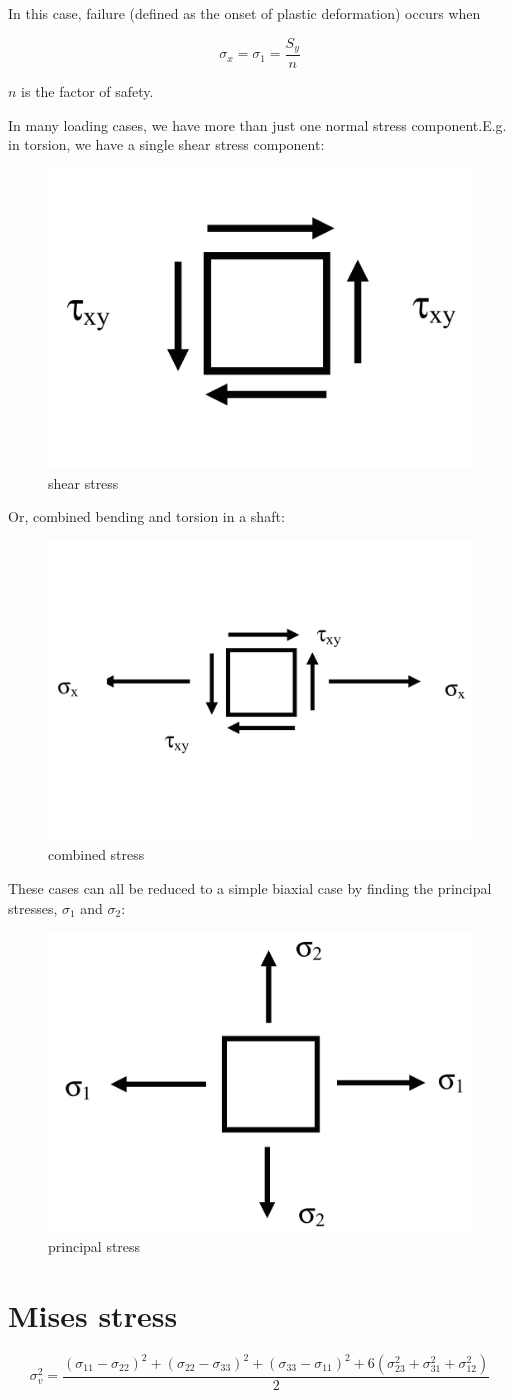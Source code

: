 In this case, failure (defined as the onset of plastic deformation) occurs when

\begin{equation}
\sigma_x = \sigma_1 = \frac{S_y}{n}
\end{equation}

$ n $ is the factor of safety.

In many loading cases, we have more than just one normal stress component.E.g. in torsion, we have a single shear stress component:

\begin{figure}[h!]
\centering
\includegraphics[width=0.3\linewidth]{figure/shear_stress}
\caption{shear stress}
\label{fig:shearstress}
\end{figure}

Or, combined bending and torsion in a shaft:

\begin{figure}[h!]
\centering
\includegraphics[width=0.3\linewidth]{figure/combined_stress}
\caption{combined stress}
\label{fig:combinedstress}
\end{figure}

These cases can all be reduced to a simple biaxial case by finding the principal stresses, $ \sigma_1 $ and $ \sigma_2 $:

\begin{figure}[h!]
\centering
\includegraphics[width=0.3\linewidth]{figure/principal_stress}
\caption{principal stress}
\label{fig:principalstress}
\end{figure}

\section{Mises stress}

\begin{equation}\label{key}
\sigma_v^2 = \dfrac{ \left( \sigma_{11}-\sigma_{22} \right)^2 + \left( \sigma_{22}-\sigma_{33} \right)^2 + \left( \sigma_{33}-\sigma_{11} \right)^2 + 6 \left( \sigma_{23}^2 + \sigma_{31}^2 + \sigma_{12}^2 \right)}{2}
\end{equation}
